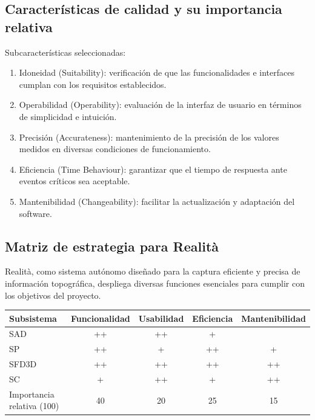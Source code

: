 \documentclass[12pt,a4paper, twoside]{article} %
\begin{document}
\subsection{Características de calidad y su importancia relativa}
\label{sec:org24980a8}



Subcaracterísticas seleccionadas:

\begin{enumerate}

\item Idoneidad (Suitability): verificación de que las funcionalidades e interfaces cumplan con los requisitos establecidos.

\item Operabilidad (Operability): evaluación de la interfaz de usuario en términos de simplicidad e intuición.

\item Precisión (Accurateness): mantenimiento de la precisión de los valores medidos en diversas condiciones de funcionamiento.

\item Eficiencia (Time Behaviour): garantizar que el tiempo de respuesta ante eventos críticos sea aceptable.

\item Mantenibilidad (Changeability): facilitar la actualización y adaptación del software.

\end{enumerate}

\subsection{Matriz de estrategia para Realità}
\label{sec:org24980a8}

Realità, como sistema autónomo diseñado para la captura eficiente y precisa de información topográfica, despliega diversas funciones esenciales para cumplir con los objetivos del proyecto.


\begin{table}[h]
\centering
\begin{tabular}{|l|c|c|c|c|}
    \hline
    Subsistema & Funcionalidad  & Usabilidad & Eficiencia & Mantenibilidad \\
    \hline
    SAD & ++ & ++ & + &  \\
    SP & ++ & + & ++ & + \\
    SFD3D & ++ & ++ & ++ & ++ \\
    SC & + & ++ & + & ++\\
    \hline
    Importancia relativa (100) & 40 & 20 & 25 & 15\\
    \hline
\end{tabular}
\end{table}
\end{document}
